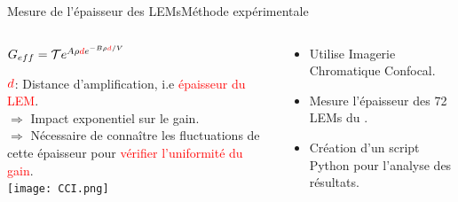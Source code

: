      \begin{frame}{Mesure de l'épaisseur des LEMs}{Méthode expérimentale}
    	\begin{scriptsize}
    		\begin{columns}
    			\begin{column}{0.5\textwidth}
    				\begin{center}
    					$G _{eff}= \mathcal{T}e^{A\rho \textcolor{red}{d} e^{-B\rho \textcolor{red}{d}/V}}$\\
    				\end{center}
    				$\textcolor{red}{d}$: Distance d'amplification, i.e \textcolor{red}{épaisseur du LEM}.\\
    				$\Rightarrow$ Impact exponentiel sur le gain.\\
    				$\Rightarrow$ Nécessaire de connaître les fluctuations de cette épaisseur pour \textcolor{red}{vérifier l'uniformité du gain}.\\
    				\vfill
    				\centering \texttt{[image: CCI.png]}\\\vfill
    			\end{column}
    			\hfill
    			\begin{column}{0.5\textwidth}
    				\begin{itemize}
    					\item Utilise Imagerie Chromatique Confocal.
    					\item Mesure l'épaisseur des 72 LEMs du \SSS{}.
    					\item Création d'un script Python pour l'analyse des résultats.
    				\end{itemize}

\end{column}
\end{columns}
\end{scriptsize}
\end{frame}
